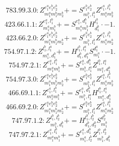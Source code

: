 \documentclass[letterpaper,10pt,fleqn,leqno,onecolumn]{article}
\begin{document}
\begin{equation} \;\;\;\;\;\;  783.99.3.0: Z^{e_{1}^{a}e_{1}^{b}e_{2}^{b}}_{m_{1}^{a}m_{1}^{b}m_{2}^{b}}+=S^{e_{1}^{b}e_{2}^{b}}_{m_{1}^{b},l_{1}^{b}}Z^{e_{1}^{a},l_{1}^{b}}_{m_{1}^{a}m_{2}^{b}} \end{equation}
\begin{equation} \;\;\;\;\;\;  423.66.1.1: Z^{e_{1}^{a},l_{1}^{b}}_{m_{1}^{a}m_{1}^{b}}+=S^{e_{1}^{a},d_{1}^{b}}_{m_{1}^{a}m_{1}^{b}}H^{l_{1}^{b}}_{d_{1}^{b}}\cdot -1. \end{equation}
\begin{equation} \;\;\;\;\;\;  423.66.2.0: Z^{e_{1}^{a}e_{1}^{b}e_{2}^{b}}_{m_{1}^{a}m_{1}^{b}m_{2}^{b}}+=S^{e_{1}^{b}e_{2}^{b}}_{m_{1}^{b},l_{1}^{b}}Z^{e_{1}^{a},l_{1}^{b}}_{m_{1}^{a}m_{2}^{b}} \end{equation}
\begin{equation} \;\;\;\;\;\;  754.97.1.2: Z^{l_{1}^{b},l_{1}^{a}}_{m_{1}^{a},d_{1}^{b}}+=H^{l_{1}^{b},l_{1}^{a}}_{d_{1}^{b},d_{1}^{a}}S^{d_{1}^{a}}_{m_{1}^{a}}\cdot -1. \end{equation}
\begin{equation} \;\;\;\;\;\;  754.97.2.1: Z^{e_{1}^{a},l_{1}^{b}}_{m_{1}^{a}m_{1}^{b}}+=S^{e_{1}^{a},d_{1}^{b}}_{m_{1}^{b},l_{1}^{a}}Z^{l_{1}^{b},l_{1}^{a}}_{m_{1}^{a},d_{1}^{b}} \end{equation}
\begin{equation} \;\;\;\;\;\;  754.97.3.0: Z^{e_{1}^{a}e_{1}^{b}e_{2}^{b}}_{m_{1}^{a}m_{1}^{b}m_{2}^{b}}+=S^{e_{1}^{b}e_{2}^{b}}_{m_{1}^{b},l_{1}^{b}}Z^{e_{1}^{a},l_{1}^{b}}_{m_{1}^{a}m_{2}^{b}} \end{equation}
\begin{equation} \;\;\;\;\;\;  466.69.1.1: Z^{e_{1}^{a},l_{1}^{b}}_{m_{1}^{a}m_{1}^{b}}+=S^{e_{1}^{a},d_{1}^{b}}_{m_{1}^{b},l_{1}^{a}}H^{l_{1}^{b},l_{1}^{a}}_{m_{1}^{a},d_{1}^{b}} \end{equation}
\begin{equation} \;\;\;\;\;\;  466.69.2.0: Z^{e_{1}^{a}e_{1}^{b}e_{2}^{b}}_{m_{1}^{a}m_{1}^{b}m_{2}^{b}}+=S^{e_{1}^{b}e_{2}^{b}}_{m_{1}^{b},l_{1}^{b}}Z^{e_{1}^{a},l_{1}^{b}}_{m_{1}^{a}m_{2}^{b}} \end{equation}
\begin{equation} \;\;\;\;\;\;  747.97.1.2: Z^{l_{1}^{b},l_{2}^{b}}_{m_{1}^{b},d_{1}^{b}}+=H^{l_{1}^{b},l_{2}^{b}}_{d_{1}^{b},d_{2}^{b}}S^{d_{2}^{b}}_{m_{1}^{b}} \end{equation}
\begin{equation} \;\;\;\;\;\;  747.97.2.1: Z^{e_{1}^{a},l_{1}^{b}}_{m_{1}^{a}m_{1}^{b}}+=S^{e_{1}^{a},d_{1}^{b}}_{m_{1}^{a},l_{2}^{b}}Z^{l_{1}^{b},l_{2}^{b}}_{m_{1}^{b},d_{1}^{b}} \end{equation}
\end{document}
